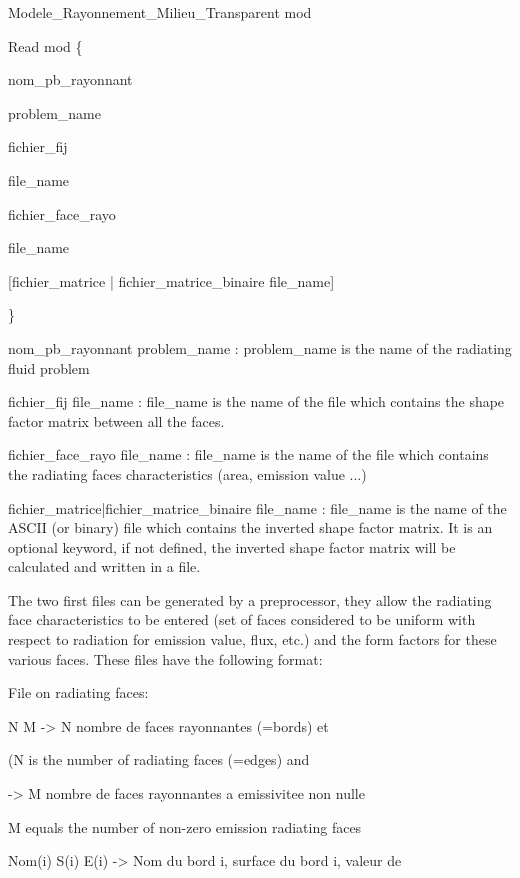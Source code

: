 



Modele\_Rayonnement\_Milieu\_Transparent mod

Read mod \{

nom\_pb\_rayonnant

problem\_name

fichier\_fij

file\_name

fichier\_face\_rayo

file\_name

[fichier\_matrice | fichier\_matrice\_binaire file\_name]

\}



nom\_pb\_rayonnant problem\_name : problem\_name is the name of the radiating fluid problem



fichier\_fij file\_name : file\_name is the name of the file which contains the shape factor matrix between all the faces.



fichier\_face\_rayo file\_name : file\_name is the name of the file which contains the radiating faces characteristics (area, emission value ...)



fichier\_matrice|fichier\_matrice\_binaire file\_name : file\_name is the name of the ASCII (or binary) file which contains the inverted shape factor matrix. It is an optional keyword, if not defined, the inverted shape factor matrix will be calculated and written in a file.



The two first files can be generated by a preprocessor, they allow the radiating face characteristics to be entered (set of faces considered to be uniform with respect to radiation for emission value, flux, etc.) and the form factors for these various faces. These files have the following format:



File on radiating faces:

N M			-> N nombre de faces rayonnantes (=bords) et

			(N is the number of radiating faces (=edges) and

                      -> M nombre de faces rayonnantes a emissivitee non nulle

			M equals the number of non-zero emission radiating faces

Nom(i) S(i) E(i)	-> Nom du bord i, surface du bord i, valeur de	


